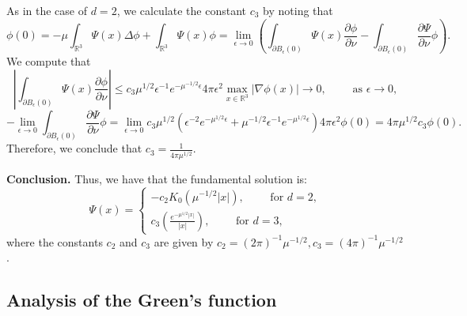 \documentclass[12pt]{article}
\def\R{{\mathbb R}}
\theoremstyle{plain}
\begin{document}
As in the case of $d = 2$, we calculate the constant $c_{3}$ by noting that
\begin{equation}\label{smoothgreen2}
\phi(0) = -\mu \int_{\R^{3}} \Psi(x) \Delta \phi + \int_{\R^{3}} \Psi(x) \phi = \lim_{\epsilon \to 0} \left(\int_{\partial B_{\epsilon}(0)} \Psi(x) \frac{\partial \phi}{\partial \nu} - \int_{\partial B_{\epsilon}(0)} \frac{\partial \Psi}{\partial \nu} \phi\right).
\end{equation}
We compute that
\begin{equation*}
\left|\int_{\partial B_{\epsilon}(0)} \Psi(x) \frac{\partial \phi}{\partial \nu}\right| \le c_{3}\mu^{1/2}\epsilon^{-1} e^{-\mu^{-1/2}\epsilon} 4\pi \epsilon^{2} \max_{x \in \R^{3}} |\nabla \phi(x)| \to 0, \qquad \text{ as } \epsilon \to 0,
\end{equation*}
\begin{equation}\label{normalizationK}
-\lim_{\epsilon \to 0} \int_{\partial B_{\epsilon}(0)} \frac{\partial \Psi}{\partial \nu} \phi = \lim_{\epsilon \to 0}  c_{3}\mu^{1/2} \left(\epsilon^{-2} e^{-\mu^{1/2}\epsilon} + \mu^{-1/2} \epsilon^{-1} e^{-\mu^{1/2}\epsilon}\right) 4\pi \epsilon^{2} \phi(0) = 4\pi \mu^{1/2} c_{3} \phi(0).
\end{equation}
Therefore, we conclude that $\displaystyle c_{3} = \frac{1}{4\pi \mu^{1/2}}$. 

\bigskip

\noindent \textbf{Conclusion.} Thus, we have that the fundamental solution is:
\begin{equation}\label{fundsoln}
\Psi(x) = \begin{cases}
    -c_{2}K_{0}(\mu^{-1/2}|x|), \qquad \text{ for } d = 2, \\
    \displaystyle c_{3} \left(\frac{e^{-\mu^{1/2}|x|}}{|x|}\right), \qquad \text{ for } d = 3,
\end{cases}
\end{equation}
where the constants $c_{2}$ and $c_{3}$ are given by $c_{2} = (2\pi)^{-1}\mu^{-1/2}, c_{3} = (4\pi)^{-1}\mu^{-1/2}$.

\subsection{Analysis of the Green's function}
\end{document}
